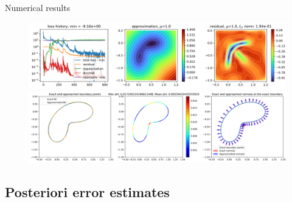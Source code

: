 \begin{frame}{Numerical results}		
    \begin{figure}[!ht] \centering
		\includegraphics[width=\linewidth]{images/newlines/levelset/EikonalBean.png}

        \vspace{10pt}

		\includegraphics[width=\linewidth]{images/newlines/levelset/boundary.png}
	\end{figure}
\end{frame}

\subsection{\filledstar Posteriori error estimates}

